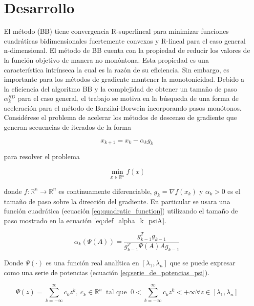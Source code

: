 
\section*{Desarrollo}

El método (BB) tiene convergencia R-superlineal para minimizar funciones cuadráticas bidimensionales fuertemente convexas y R-lineal para el caso general n-dimensional\cite{Fletcher_2005}. El método de BB cuenta con la propiedad de reducir los valores de la función objetivo de manera no monóntona. Esta propiedad es una característica intrínseca la cual es la razón de su eficiencia. Sin embargo, es importante para los métodos de gradiente mantener la monotonicidad. Debido a la eficiencia del algoritmo BB y la complejidad de obtener un tamaño de paso $\alpha_k^{SD}$ para el caso general, el trabajo se motiva en la búsqueda de una forma de aceleración para el método de Barzilai-Borwein incorporando pasos monótonos. Considérese el problema de acelerar los métodos de descenso de gradiente que generan secuencias de iterados de la forma

\begin{equation*}
    x_{k+1} = x_k - \alpha_k g_k
\end{equation*}

para resolver el problema

\begin{equation*}
    \min_{x\in\mathbb{R}^n}f(x)
\end{equation*}

donde $f:\mathbb{R}^n \rightarrow \mathbb{R}^n$ es continuamente diferenciable, $g_k=\nabla f(x_k)$ y $\alpha_k>0$ es el tamaño de paso sobre la dirección del gradiente. En particular se usara una función cuadrática (ecuación \ref{eq:quadratic_function}) utilizando el tamaño de paso mostrado en la ecuación \ref{eq:def_alpha_k_psiA}.

\begin{equation}
    \alpha_k(\Psi(A)) = \frac{g_{k-1}^Tg_{k-1}}{g^T_{k-1}\Psi(A)Ag_{k-1}} \label{eq:def_alpha_k_psiA}
\end{equation}

Donde $\Psi(\cdot)$ es una función real analítica en $[\lambda_1, \lambda_n]$ que se puede expresar como una serie de potencias (ecuación \ref{eq:serie_de_potencias_psi}).

\begin{equation}
    \Psi(z) = \sum\limits_{k=-\infty}^{\infty} c_kz^k,\ c_k\in \mathbb{R}^n  \;\; \text{tal que} \;\; 0<\sum_{k =- \infty}^{\infty}c_k z^k<+\infty \forall z \in[\lambda_1,  \lambda_n]  \label{eq:serie_de_potencias_psi}
\end{equation}

